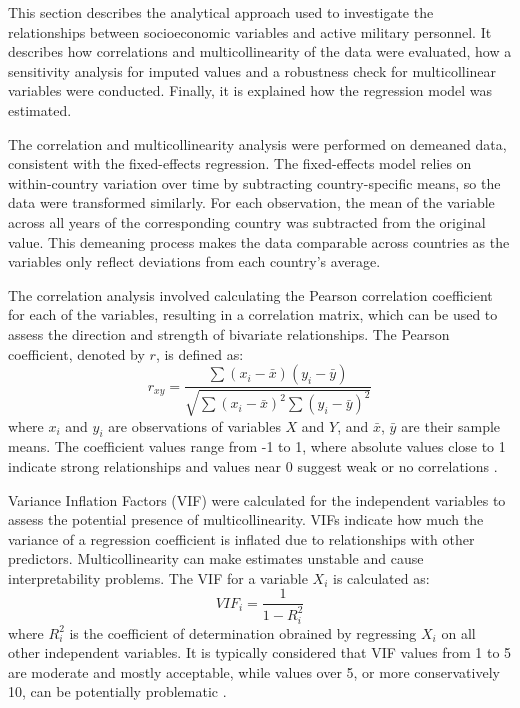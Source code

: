 This section describes the analytical approach used to investigate the relationships between socioeconomic variables and active military personnel.
It describes how correlations and multicollinearity of the data were evaluated, how a sensitivity analysis for imputed values and a robustness check for multicollinear variables were conducted. 
Finally, it is explained how the regression model was estimated.

The correlation and multicollinearity analysis were performed on demeaned data, consistent with the fixed-effects regression. 
The fixed-effects model relies on within-country variation over time by subtracting country-specific means, so the data were transformed similarly. 
For each observation, the mean of the variable across all years of the corresponding country was subtracted from the original value. 
This demeaning process makes the data comparable across countries as the variables only reflect deviations from each country's average. 

The correlation analysis involved calculating the Pearson correlation coefficient for each of the variables, resulting in a correlation matrix, which can be used to assess the direction and strength of bivariate relationships.
The Pearson coefficient, denoted by $r$, is defined as:
\begin{equation*}
    r_{xy} = \frac{\sum(x_i - \bar{x})(y_i - \bar{y})}{\sqrt{\sum(x_i - \bar{x})^2 \sum(y_i - \bar{y})^2}}
\end{equation*}
where $x_i$ and $y_i$ are observations of variables $X$ and $Y$, and $\bar{x}$, $\bar{y}$ are their sample means. 
The coefficient values range from -1 to 1, where absolute values close to 1 indicate strong relationships and values near 0 suggest weak or no correlations \parencite{cohen_bivariate_2003}. 

Variance Inflation Factors (VIF) were calculated for the independent variables to assess the potential presence of multicollinearity. 
VIFs indicate how much the variance of a regression coefficient is inflated due to relationships with other predictors. 
Multicollinearity can make estimates unstable and cause interpretability problems. 
The VIF for a variable $X_i$ is calculated as:
\begin{equation*}
    VIF_i = \frac{1}{1-R^2_i}
\end{equation*}
where $R^2_i$ is the coefficient of determination obrained by regressing $X_i$ on all other independent variables. 
It is typically considered that VIF values from 1 to 5 are moderate and mostly acceptable, while values over 5, or more conservatively 10, can be potentially problematic \parencite{obrien_caution_2007}.

